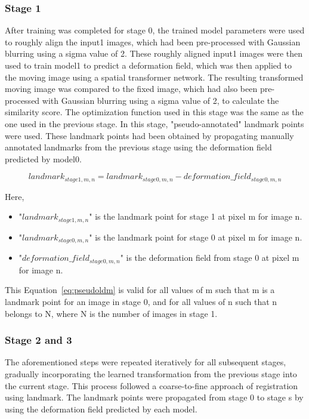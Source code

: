 \documentclass{report}
\begin{document}
	\subsubsection{Stage 1}
	After training was completed for stage 0, the trained model parameters were used to roughly align the input1 images, which had been pre-processed with Gaussian blurring using a sigma value of 2. These roughly aligned input1 images were then used to train model1 to predict a deformation field, which was then applied to the moving image using a spatial transformer network. The resulting transformed moving image was compared to the fixed image, which had also been pre-processed with Gaussian blurring using a sigma value of 2, to calculate the similarity score. The optimization function used in this stage was the same as the one used in the previous stage. In this stage, "pseudo-annotated" landmark points were used. These landmark points had been obtained by propagating manually annotated landmarks from the previous stage using the deformation field predicted by model0.
	
	\begin{equation}\label{eq:pseudoldm}
		landmark_{stage1,m,n} = landmark_{stage0,m,n} - deformation\_field_{stage0,m,n}
	\end{equation}
	
	Here, 
	\begin{itemize}
		\item "$landmark_{stage1,m,n}$" is the landmark point for stage 1 at pixel m for image n.
		\item "$landmark_{stage0,m,n}$" is the landmark point for stage 0 at pixel m for image n.
		\item "$deformation\_field_{stage0,m,n}$" is the deformation field from stage 0 at pixel m for image n.    
	\end{itemize}
	
	This Equation~\ref{eq:pseudoldm} is valid for all values of m such that m is a landmark point for an image in stage 0, and for all values of n such that n belongs to N, where N is the number of images in stage 1.
	
	\subsubsection{Stage 2 and 3}
	The aforementioned steps were repeated iteratively for all subsequent stages, gradually incorporating the learned transformation from the previous stage into the current stage. This process followed a coarse-to-fine approach of registration using landmark. The landmark points were propagated from stage 0 to stage s by using the deformation field predicted by each model.
	
\end{document}
